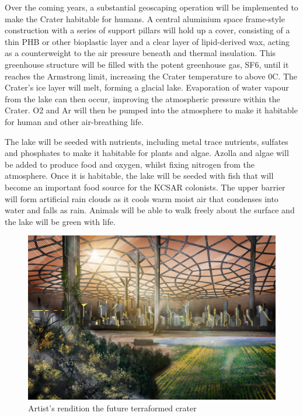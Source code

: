 \documentclass[fleqn,10pt]{Stylesheet} %
\begin{document}
Over the coming years, a substantial geoscaping operation will be implemented to make the Crater habitable for humans. A central aluminium space frame-style construction with a series of support pillars will hold up a cover, consisting of a thin PHB or other bioplastic layer and a clear layer of lipid-derived wax, acting as a counterweight to the air pressure beneath and thermal insulation. This greenhouse structure will be filled with the potent greenhouse gas, SF6, until it reaches the Armstrong limit, increasing the Crater temperature to above 0\degree{}C. The Crater’s ice layer will melt, forming a glacial lake. Evaporation of water vapour from the lake can then occur, improving the atmospheric pressure within the Crater. O2 and Ar will then be pumped into the atmosphere to make it habitable for human and other air-breathing life.

The lake will be seeded with nutrients, including metal trace nutrients, sulfates and phosphates to make it habitable for plants and algae. Azolla and algae will be added to produce food and oxygen, whilst fixing nitrogen from the atmosphere. Once it is habitable, the lake will be seeded with fish that will become an important food source for the KCSAR colonists. The upper barrier will form artificial rain clouds as it cools warm moist air that condenses into water and falls as rain. Animals will be able to walk freely about the surface and the lake will be green with life. 

\begin{figure}
    \centering
    \includegraphics[width=\linewidth]{art/terraformed_dome.jpg}
    \caption{Artist's rendition the future terraformed crater}
    \label{fig:final_dome}
\end{figure}
\end{document}
